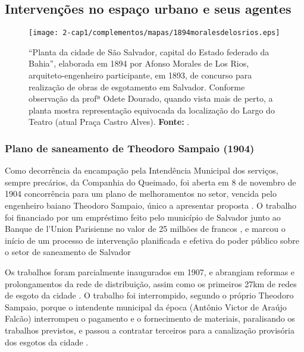 \subsection{Intervenções no espaço urbano e seus agentes}\label{subsec:1.4.3}

\begin{figure}[!htp]
\centering
\texttt{[image: 2-cap1/complementos/mapas/1894moralesdelosrios.eps]} 
\caption{``Planta da cidade de São Salvador, capital do Estado federado da Bahia'', elaborada em 1894 por Afonso Morales de Los Rios, arquiteto-engenheiro participante, em 1893, de concurso para realização de obras de esgotamento em Salvador. Conforme observação da profª Odete Dourado, quando vista mais de perto, a planta mostra representação equivocada da localização do Largo do Teatro (atual Praça Castro Alves). \textbf{Fonte:} .}
\end{figure}

\subsubsection{Plano de saneamento de Theodoro Sampaio (1904)}\label{subsubsec:1.4.3.1}

Como decorrência da encampação pela Intendência Municipal dos serviços, sempre precários, da Companhia do Queimado, foi aberta em 8 de novembro de 1904 concorrência para um plano de melhoramentos no setor, vencida pelo engenheiro baiano Theodoro Sampaio, único a apresentar proposta \cite[150]{gordilhobarbosa_eau_2004}. O trabalho foi financiado por um empréstimo feito pelo município de Salvador junto ao Banque de l'Union Parisienne no valor de 25 milhões de francos \cite[p.~150]{gordilhobarbosa_eau_2004}, e marcou o início de um processo de intervenção planificada e efetiva do poder público sobre o setor de saneamento de Salvador \cite[p.~150]{gordilhobarbosa_eau_2004} 

Os trabalhos foram parcialmente inaugurados em 1907, e abrangiam reformas e prolongamentos da rede de distribuição, assim como os primeiros 27km de redes de esgoto da cidade \cite[p.~151]{gordilhobarbosa_eau_2004}. O trabalho foi interrompido, segundo o próprio Theodoro Sampaio, porque o intendente municipal da época (Antônio Victor de Araújo Falcão) interrompeu o pagamento e o fornecimento de materiais, paralisando os trabalhos previstos, e passou a contratar terceiros para a canalização provisória dos esgotos da cidade \cite[p.~152]{gordilhobarbosa_eau_2004}.

